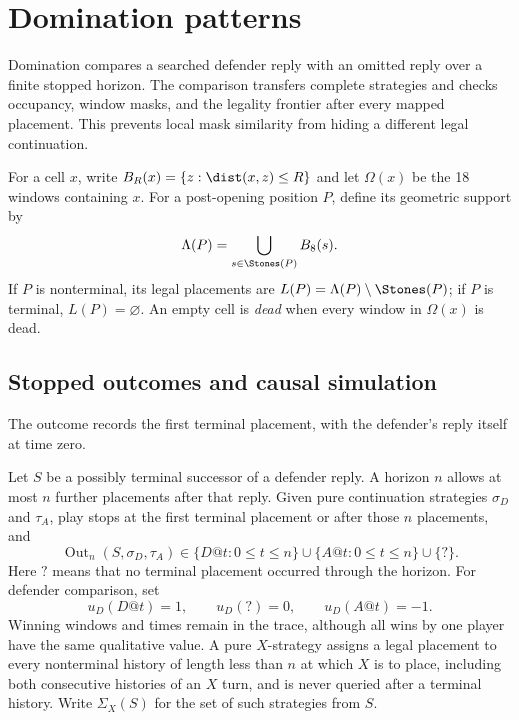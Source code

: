 \section{Domination patterns}
\label{sec:domination}

Domination compares a searched defender reply with an omitted reply over a
finite stopped horizon.  The comparison transfers complete strategies and
checks occupancy, window masks, and the legality frontier after every mapped
placement.  This prevents local mask similarity from hiding a different legal
continuation.

For a cell $x$, write $B_R(x)=\{z:\dist(x,z)\le R\}$ and let $\Omega(x)$ be
the 18 windows containing $x$.  For a post-opening position $P$, define its
geometric support by
\[
  \Lambda(P)=\bigcup_{s\in\Stones(P)}B_8(s).
\]
If $P$ is nonterminal, its legal placements are
$L(P)=\Lambda(P)\setminus\Stones(P)$; if $P$ is terminal, $L(P)=\varnothing$.
An empty cell is \emph{dead} when every window in $\Omega(x)$ is dead.

\subsection{Stopped outcomes and causal simulation}

The outcome records the first terminal placement, with the defender's reply
itself at time zero.

\begin{definition}
\label{def:Dom-D3}
Let $S$ be a possibly terminal successor of a defender reply.  A horizon $n$
allows at most $n$ further placements after that reply.  Given pure
continuation strategies $\sigma_D$ and $\tau_A$, play stops at the first
terminal placement or after those $n$ placements, and
\[
  \operatorname{Out}_n(S,\sigma_D,\tau_A)
  \in\{D@t:0\le t\le n\}\cup
      \{A@t:0\le t\le n\}\cup\{?\}.
\]
Here $? $ means that no terminal placement occurred through the horizon.  For
defender comparison, set
\[
  u_D(D@t)=1,
  \qquad u_D(?)=0,
  \qquad u_D(A@t)=-1.
\]
Winning windows and times remain in the trace, although all wins by one player
have the same qualitative value.  A pure $X$-strategy assigns a legal
placement to every nonterminal history of length less than $n$ at which $X$
is to place, including both consecutive histories of an $X$ turn, and is
never queried after a terminal history.  Write $\Sigma_X(S)$ for the set of
such strategies from $S$.
\end{definition}

